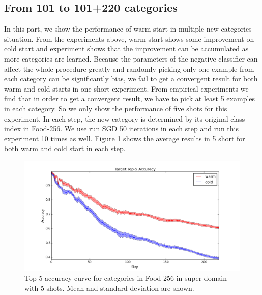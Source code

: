 \subsection{From 101 to 101+220 categories}
In this part, we show the performance of warm start in multiple new categories situation. From the experiments above, warm start shows some improvement on cold start and experiment shows that the improvement can be accumulated as more categories are learned. Because the parameters of the negative classifier can affect the whole procedure greatly and randomly picking only one example from each category can be significantly bias, we fail to get a convergent result for both warm and cold starts in one short experiment.
From empirical experiments we find that in order to get a convergent result, we have to pick at least 5 examples in each category. So we only show the performance of five shots for this experiment. In each step, the new category is determined by its original class index in Food-256. We use run SGD 50 iterations in each step and run this experiment 10 times as well. Figure \ref{fig:wama} shows the average results in 5 short for both warm and cold start in each step.

\begin{figure}
  \centering
    \includegraphics[scale=0.4]{fig/M+N.png}
    \caption{Top-5 accuracy curve for categories in Food-256 in super-domain with 5 shots. Mean and standard deviation are shown.}
      \label{fig:wama}
\end{figure}

